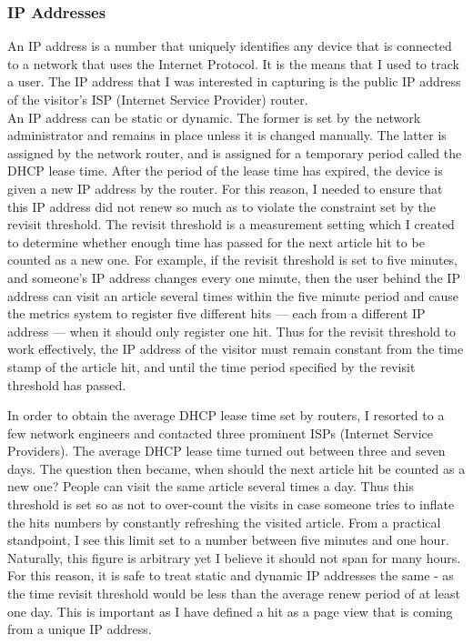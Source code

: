 \documentclass[12pt]{article}
\begin{document}
\subsubsection{IP Addresses}
An IP address is a number that uniquely identifies any device that is connected to a network that uses the Internet Protocol. It is the means that I used to track a user. The IP address that I was interested in capturing is the public IP address of the visitor's ISP (Internet Service Provider) router. \\
An IP address can be static or dynamic. The former is set by the network administrator and remains in place unless it is changed manually. The latter is assigned by the network router, and is assigned for a temporary period called the DHCP lease time. After the period of the lease time has expired, the device is given a new IP address by the router. For this reason, I needed to ensure that this IP address did not renew so much as to violate the constraint set by the revisit threshold. The revisit threshold is a measurement setting which I created to determine whether enough time has passed for the next article hit to be counted as a new one. For example, if the revisit threshold is set to five minutes, and someone's IP address changes every one minute, then the user behind the IP address can visit an article several times within the five minute period and cause the metrics system to register five different hits --- each from a different IP address --- when it should only register one hit. Thus for the revisit threshold to work effectively, the IP address of the visitor must remain constant from the time stamp of the article hit, and until the time period specified by the revisit threshold has passed. 

In order to obtain the average DHCP lease time set by routers, I resorted to a few network engineers and contacted three prominent ISPs (Internet Service Providers). The average DHCP lease time turned out between three and seven days. The question then became, when should the next article hit be counted as a new one? People can visit the same article several times a day. Thus this threshold is set so as not to over-count the visits in case someone tries to inflate the hits numbers by constantly refreshing the visited article. From a practical standpoint, I see this limit set to a number between five minutes and one hour. Naturally, this figure is arbitrary yet I believe it should not span for many hours. For this reason, it is safe to treat static and dynamic IP addresses the same - as the time revisit threshold would be less than the average renew period of at least one day. This is important as I have defined a hit as a page view that is coming from a unique IP address.
\end{document}
